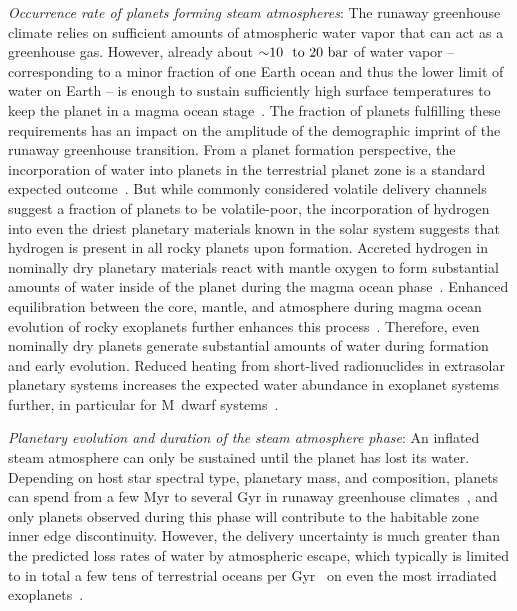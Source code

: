 \documentclass[twocolumn,twocolappendix,linenumbers]{aastex631}
\begin{document}
\textit{Occurrence rate of planets forming steam atmospheres}: The runaway greenhouse climate relies on sufficient amounts of atmospheric water vapor that can act as a greenhouse gas.
However, already about $\SIrange{\sim 10}{20} \, \mathrm{bar}$ of water vapor -- corresponding to a minor fraction of one Earth ocean and thus the lower limit of water on Earth -- is enough to sustain sufficiently high surface temperatures to keep the planet in a magma ocean stage~\citep{Boukrouche2021,Lichtenberg2021c}.
The fraction of planets fulfilling these requirements has an impact on the amplitude of the demographic imprint of the runaway greenhouse transition.
From a planet formation perspective, the incorporation of water into planets in the terrestrial planet zone is a standard expected outcome~\citep[e.g.,][]{2019PNAS..116.9723Z,Venturini2020,Emsenhuber2021b,Schlecker2021,Burn2021}.
But while commonly considered volatile delivery channels suggest a fraction of planets to be volatile-poor, the incorporation of hydrogen into even the driest planetary materials known in the solar system suggests that hydrogen is present in all rocky planets upon formation.
Accreted hydrogen in nominally dry planetary materials react with mantle oxygen to form substantial amounts of water inside of the planet during the magma ocean phase~\citep{Ikoma2018,2021ApJ...909L..22K,2020MNRAS.496.3755K,2022NatAs...6.1296K}.
Enhanced equilibration between the core, mantle, and atmosphere during magma ocean evolution of rocky exoplanets further enhances this process~\citep{2021ApJ...914L...4L,Schlichting2022}.
Therefore, even nominally dry planets generate substantial amounts of water during formation and early evolution.
Reduced heating from short-lived radionuclides in extrasolar planetary systems increases the expected water abundance in exoplanet systems further, in particular for M~dwarf systems~\citep{2022ApJ...938L...3L}.

\textit{Planetary evolution and duration of the steam atmosphere phase}: An inflated steam atmosphere can only be sustained until the planet has lost its water.
Depending on host star spectral type, planetary mass, and composition, planets can spend from a few Myr to several Gyr in runaway greenhouse climates~\citep[][]{Hamano2015,Luger2015}, and only planets observed during this phase will contribute to the habitable zone inner edge discontinuity.
However, the delivery uncertainty is much greater than the predicted loss rates of water by atmospheric escape, which typically is limited to in total a few tens of terrestrial oceans per Gyr~\citep{2018AJ....155..195W} on even the most irradiated exoplanets~\citep[see discussion in][]{2022ApJ...938L...3L}.
\end{document}
